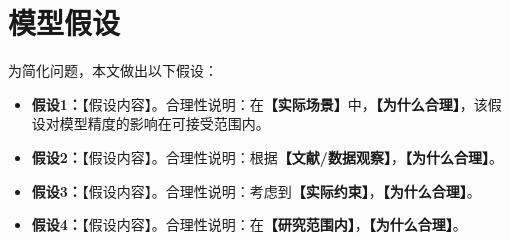 
\section{模型假设}

为简化问题，本文做出以下假设：

\begin{itemize}
  \item \textbf{假设1：}【假设内容】。合理性说明：在\textbf{【实际场景】}中，\textbf{【为什么合理】}，该假设对模型精度的影响在可接受范围内。

  \item \textbf{假设2：}【假设内容】。合理性说明：根据\textbf{【文献/数据观察】}，\textbf{【为什么合理】}。

  \item \textbf{假设3：}【假设内容】。合理性说明：考虑到\textbf{【实际约束】}，\textbf{【为什么合理】}。

  \item \textbf{假设4：}【假设内容】。合理性说明：在\textbf{【研究范围内】}，\textbf{【为什么合理】}。
\end{itemize}
